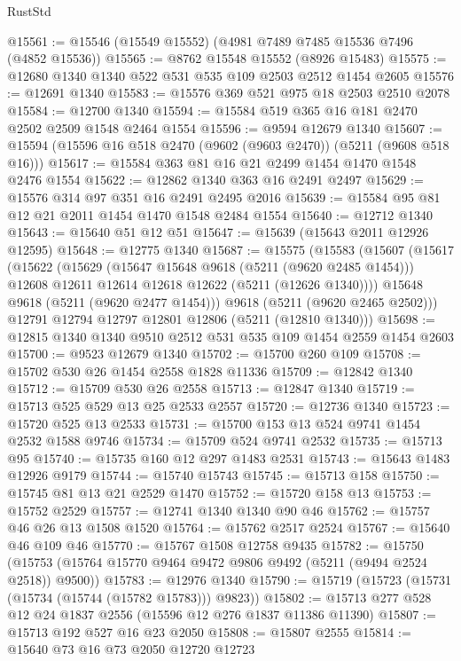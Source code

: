 \begin{lexlean}{RustStd}
\begin{coremodule}
@15561 := @15546 (@15549 @15552) (@4981 @7489 @7485 @15536 @7496 (@4852 @15536))
@15565 := @8762 @15548 @15552 (@8926 @15483)
@15575 := @12680 @1340 @1340 @522 @531 @535 @109 @2503 @2512 @1454 @2605
@15576 := @12691 @1340
@15583 := @15576 @369 @521 @975 @18 @2503 @2510 @2078
@15584 := @12700 @1340
@15594 := @15584 @519 @365 @16 @181 @2470 @2502 @2509 @1548 @2464 @1554
@15596 := @9594 @12679 @1340
@15607 := @15594 (@15596 @16 @518 @2470 (@9602 (@9603 @2470)) (@5211 (@9608 @518 @16)))
@15617 := @15584 @363 @81 @16 @21 @2499 @1454 @1470 @1548 @2476 @1554
@15622 := @12862 @1340 @363 @16 @2491 @2497
@15629 := @15576 @314 @97 @351 @16 @2491 @2495 @2016
@15639 := @15584 @95 @81 @12 @21 @2011 @1454 @1470 @1548 @2484 @1554
@15640 := @12712 @1340
@15643 := @15640 @51 @12 @51
@15647 := @15639 (@15643 @2011 @12926 @12595)
@15648 := @12775 @1340
@15687 := @15575
    (@15583
      (@15607
        (@15617
          (@15622
            (@15629
              (@15647 @15648 @9618 (@5211 (@9620 @2485 @1454)))
              @12608
              @12611
              @12614
              @12618
              @12622
              (@5211 (@12626 @1340))))
          @15648
          @9618
          (@5211 (@9620 @2477 @1454)))
        @9618
        (@5211 (@9620 @2465 @2502)))
      @12791
      @12794
      @12797
      @12801
      @12806
      (@5211 (@12810 @1340)))
@15698 := @12815 @1340 @1340 @9510 @2512 @531 @535 @109 @1454 @2559 @1454 @2603
@15700 := @9523 @12679 @1340
@15702 := @15700 @260 @109
@15708 := @15702 @530 @26 @1454 @2558 @1828 @11336
@15709 := @12842 @1340
@15712 := @15709 @530 @26 @2558
@15713 := @12847 @1340
@15719 := @15713 @525 @529 @13 @25 @2533 @2557
@15720 := @12736 @1340
@15723 := @15720 @525 @13 @2533
@15731 := @15700 @153 @13 @524 @9741 @1454 @2532 @1588 @9746
@15734 := @15709 @524 @9741 @2532
@15735 := @15713 @95
@15740 := @15735 @160 @12 @297 @1483 @2531
@15743 := @15643 @1483 @12926 @9179
@15744 := @15740 @15743
@15745 := @15713 @158
@15750 := @15745 @81 @13 @21 @2529 @1470
@15752 := @15720 @158 @13
@15753 := @15752 @2529
@15757 := @12741 @1340 @1340 @90 @46
@15762 := @15757 @46 @26 @13 @1508 @1520
@15764 := @15762 @2517 @2524
@15767 := @15640 @46 @109 @46
@15770 := @15767 @1508 @12758 @9435
@15782 := @15750 (@15753 (@15764 @15770 @9464 @9472 @9806 @9492 (@5211 (@9494 @2524 @2518)) @9500))
@15783 := @12976 @1340
@15790 := @15719 (@15723 (@15731 (@15734 (@15744 (@15782 @15783))) @9823))
@15802 := @15713 @277 @528 @12 @24 @1837 @2556 (@15596 @12 @276 @1837 @11386 @11390)
@15807 := @15713 @192 @527 @16 @23 @2050
@15808 := @15807 @2555
@15814 := @15640 @73 @16 @73 @2050 @12720 @12723

\end{coremodule}
\end{lexlean}
